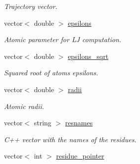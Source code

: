 \begin{DoxyCompactItemize}
\begin{DoxyCompactList}\small\item\em Trajectory vector. \item\end{DoxyCompactList}\item 
\hypertarget{classMol2_adcc95358a2c491ac6a14a30044787472}{
vector$<$ double $>$ \hyperlink{classMol2_adcc95358a2c491ac6a14a30044787472}{epsilons}}
\label{classMol2_adcc95358a2c491ac6a14a30044787472}

\begin{DoxyCompactList}\small\item\em Atomic parameter for LJ computation. \item\end{DoxyCompactList}\item 
\hypertarget{classMol2_ae70f58cb375c447b9ec696083ee9eef8}{
vector$<$ double $>$ \hyperlink{classMol2_ae70f58cb375c447b9ec696083ee9eef8}{epsilons\_\-sqrt}}
\label{classMol2_ae70f58cb375c447b9ec696083ee9eef8}

\begin{DoxyCompactList}\small\item\em Squared root of atoms epsilons. \item\end{DoxyCompactList}\item 
\hypertarget{classMol2_a7b15edd05ff72f2d22479ad8f4d1429a}{
vector$<$ double $>$ \hyperlink{classMol2_a7b15edd05ff72f2d22479ad8f4d1429a}{radii}}
\label{classMol2_a7b15edd05ff72f2d22479ad8f4d1429a}

\begin{DoxyCompactList}\small\item\em Atomic radii. \item\end{DoxyCompactList}\item 
\hypertarget{classMol2_ae90bc79def72332bc0673ad31ad73fdd}{
vector$<$ string $>$ \hyperlink{classMol2_ae90bc79def72332bc0673ad31ad73fdd}{resnames}}
\label{classMol2_ae90bc79def72332bc0673ad31ad73fdd}

\begin{DoxyCompactList}\small\item\em C++ vector with the names of the residues. \item\end{DoxyCompactList}\item 
\hypertarget{classMol2_af422c05d5d408a1b5d64522532ace2d3}{
vector$<$ int $>$ \hyperlink{classMol2_af422c05d5d408a1b5d64522532ace2d3}{residue\_\-pointer}}
\label{classMol2_af422c05d5d408a1b5d64522532ace2d3}


\end{DoxyCompactItemize}
